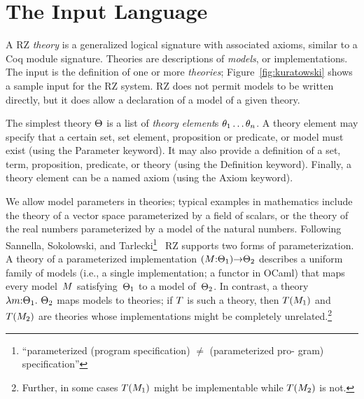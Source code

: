 
\section{The Input Language}
\label{sec:input-language}

A RZ \emph{theory} is a generalized logical signature with associated
axioms, similar to a Coq module signature. Theories are descriptions
of \emph{models}, or implementations. The input is the definition of
one or more \emph{theories}; Figure~\ref{fig:kuratowski} shows a
sample input for the RZ system. RZ does not permit models to be
written directly, but it does allow a declaration of a model of a
given theory.

The simplest theory $\Theta$ is a list of \emph{theory element}\/s
$\theta_1 \ldots \theta_n$. A theory element may specify that a certain
set, set element, proposition or predicate, or model must exist (using
the 
\textsf{Parameter} keyword). It may also provide a definition
of a set, term, proposition, predicate, or theory (using the 
\textsf{Definition} keyword). Finally, a theory element can be
a named axiom (using the \textsf{Axiom} keyword).

We allow model parameters in theories; 
typical examples in mathematics include
the theory of a vector space parameterized by a field of scalars,
or the theory of the real numbers parameterized by a model of the
natural numbers.
Following Sannella, Sokolowski, and 
Tarlecki\footnote{``parameterized (program specification) $\not=$ (parameterized pro- 
gram) specification''}~\cite{sannella+:92} RZ supports two forms of parameterization.  A theory of a parameterized implementation
$(M{:}\Theta_1){\to}\Theta_2$ describes a uniform family of models (i.e.,
a single implementation; a functor in OCaml) that maps every
model~$M$ satisfying~$\Theta_1$ to a model of~$\Theta_2$.  In contrast,
a theory $\lambda m{:}\Theta_1.\ \Theta_2$
maps models to theories; if $T$ is such a theory, then
$T(M_1)$ and $T(M_2)$ are theories whose implementations might be completely unrelated.\footnote{
Further, in some cases $T(M_1)$ might be implementable while $T(M_2)$ is not.
}

